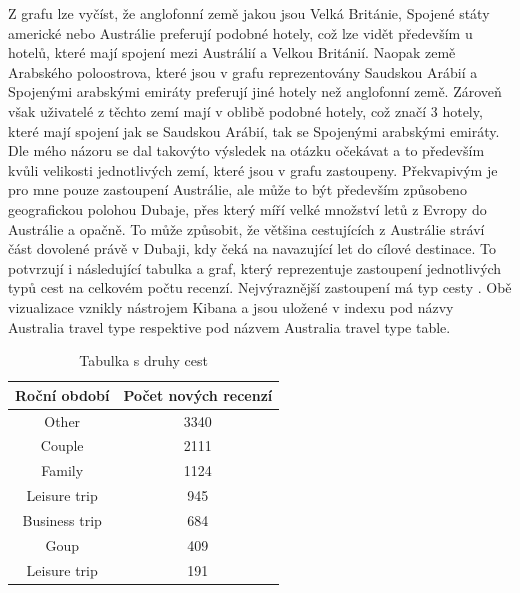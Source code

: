 \documentclass[czech,BP]{thesiskiv}
\begin{document}
Z grafu lze vyčíst, že anglofonní země jakou jsou Velká Británie, Spojené státy americké nebo Austrálie preferují podobné hotely, což lze vidět především u hotelů, které mají spojení mezi Austrálií a Velkou Británií. Naopak země Arabského poloostrova, které jsou v grafu reprezentovány Saudskou Arábií a Spojenými arabskými emiráty preferují jiné hotely než anglofonní země. Zároveň však uživatelé z těchto zemí mají v oblibě podobné hotely, což značí 3 hotely, které mají spojení jak se Saudskou Arábií, tak se Spojenými arabskými emiráty. Dle mého názoru se dal takovýto výsledek na otázku očekávat a to především kvůli velikosti jednotlivých zemí, které jsou v grafu zastoupeny. Překvapivým je pro mne pouze zastoupení Austrálie, ale může to být především způsobeno geografickou polohou Dubaje, přes který míří velké množství letů z Evropy do Austrálie a opačně. To může způsobit, že většina cestujících z Austrálie stráví část dovolené právě v Dubaji, kdy čeká na navazující let do cílové destinace. To potvrzují i následující tabulka a graf, který reprezentuje zastoupení jednotlivých typů cest na celkovém počtu recenzí. Nejvýraznější zastoupení má typ cesty . Obě vizualizace vznikly nástrojem Kibana a jsou uložené v indexu  pod názvy Australia travel type respektive pod názvem Australia travel type table.
\begin{table}[h]
	\centering
	
	\begin{tabular}{|c|c|}
		\hline
		\multicolumn{1}{|l|}{\textbf{Roční období}} & \multicolumn{1}{l|}{\textbf{Počet nových recenzí}} \\ \hline
		Other                                        &  3340                                              \\ \hline
		Couple                                        &  2111                                            \\ \hline
		Family                                        &  1124                                              \\ \hline
		Leisure trip                                      &  945                                              \\ \hline
		Business trip                                      &  684                                              \\ \hline
		Goup                                      &  409                                              \\ \hline
		Leisure trip                                      &  191                                              \\ \hline
	\end{tabular}
\caption{Tabulka s druhy cest}
\end{table}
\end{document}
